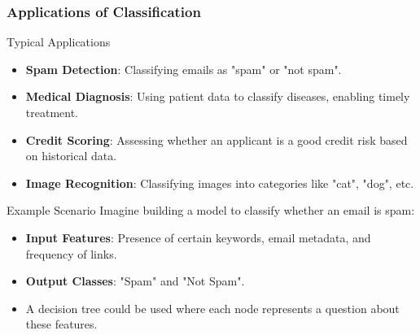 \documentclass[aspectratio=169]{beamer}
\begin{document}
\begin{frame}[fragile]
  \frametitle{Applications of Classification}
  \begin{block}{Typical Applications}
    \begin{itemize}
      \item \textbf{Spam Detection}: Classifying emails as "spam" or "not spam".
      \item \textbf{Medical Diagnosis}: Using patient data to classify diseases, enabling timely treatment.
      \item \textbf{Credit Scoring}: Assessing whether an applicant is a good credit risk based on historical data.
      \item \textbf{Image Recognition}: Classifying images into categories like "cat", "dog", etc.
    \end{itemize}
  \end{block}

  \begin{block}{Example Scenario}
    Imagine building a model to classify whether an email is spam:
    \begin{itemize}
      \item \textbf{Input Features}: Presence of certain keywords, email metadata, and frequency of links.
      \item \textbf{Output Classes}: "Spam" and "Not Spam".
      \item A decision tree could be used where each node represents a question about these features.
    \end{itemize}
  \end{block}
\end{frame}
\end{document}
